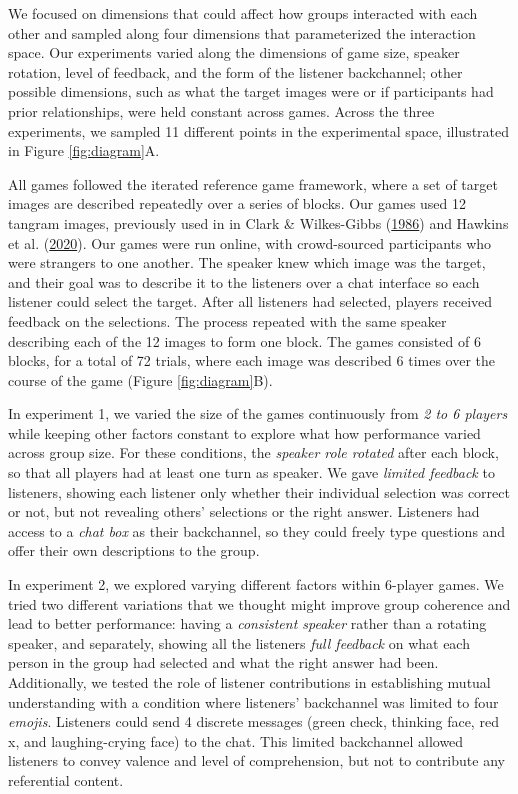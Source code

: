\documentclass[
  english,
  a4paper,
]{article}
\begin{document}
We focused on dimensions that could affect how groups interacted with each other and sampled along four dimensions that parameterized the interaction space. Our experiments varied along the dimensions of game size, speaker rotation, level of feedback, and the form of the listener backchannel; other possible dimensions, such as what the target images were or if participants had prior relationships, were held constant across games. Across the three experiments, we sampled 11 different points in the experimental space, illustrated in Figure \ref{fig:diagram}A.

All games followed the iterated reference game framework, where a set of target images are described repeatedly over a series of blocks. Our games used 12 tangram images, previously used in in Clark \& Wilkes-Gibbs (\protect\hyperlink{ref-clark1986}{1986}) and Hawkins et al. (\protect\hyperlink{ref-hawkins2020}{2020}). Our games were run online, with crowd-sourced participants who were strangers to one another. The speaker knew which image was the target, and their goal was to describe it to the listeners over a chat interface so each listener could select the target. After all listeners had selected, players received feedback on the selections. The process repeated with the same speaker describing each of the 12 images to form one block. The games consisted of 6 blocks, for a total of 72 trials, where each image was described 6 times over the course of the game (Figure \ref{fig:diagram}B).

In experiment 1, we varied the size of the games continuously from \emph{2 to 6 players} while keeping other factors constant to explore what how performance varied across group size. For these conditions, the \emph{speaker role rotated} after each block, so that all players had at least one turn as speaker. We gave \emph{limited feedback} to listeners, showing each listener only whether their individual selection was correct or not, but not revealing others' selections or the right answer. Listeners had access to a \emph{chat box} as their backchannel, so they could freely type questions and offer their own descriptions to the group.

In experiment 2, we explored varying different factors within 6-player games. We tried two different variations that we thought might improve group coherence and lead to better performance: having a \emph{consistent speaker} rather than a rotating speaker, and separately, showing all the listeners \emph{full feedback} on what each person in the group had selected and what the right answer had been. Additionally, we tested the role of listener contributions in establishing mutual understanding with a condition where listeners' backchannel was limited to four \emph{emojis}. Listeners could send 4 discrete messages (green check, thinking face, red x, and laughing-crying face) to the chat. This limited backchannel allowed listeners to convey valence and level of comprehension, but not to contribute any referential content.
\end{document}
